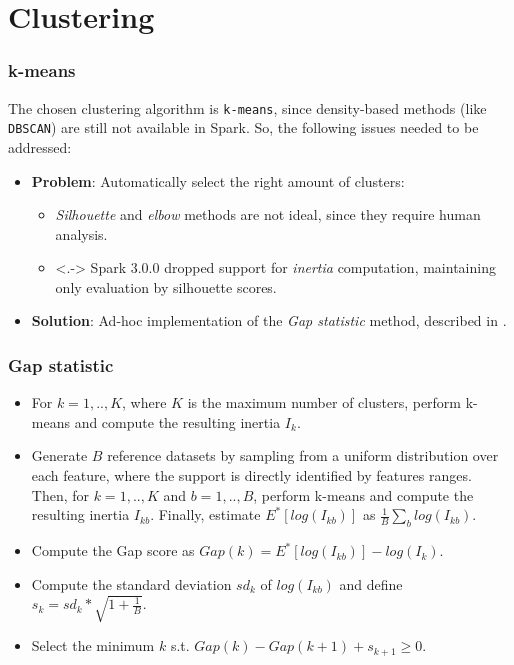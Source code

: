 \documentclass{beamer}
\begin{document}
\section{Clustering}
\begin{frame}
  \frametitle{k-means}
    The chosen clustering algorithm is \texttt{k-means}, since density-based methods (like \texttt{DBSCAN}) are still not available in Spark. So, the following issues needed to be addressed:
    \begin{itemize}[<+->]
      \item \textbf{Problem}: Automatically select the right amount of clusters:
      \begin{itemize}
        \item \textit{Silhouette} and \textit{elbow} methods are not ideal, since they require human analysis.
        \item<.-> Spark 3.0.0 dropped support for \textit{inertia} computation, maintaining only evaluation by silhouette scores.
      \end{itemize} 
      \item \textbf{Solution}: Ad-hoc implementation of the \textit{Gap statistic} method, described in \cite{gap}.
    \end{itemize}
\end{frame}

\begin{frame}
  \frametitle{Gap statistic}
    \begin{itemize}[<+->]
      \item For $k = 1, .., K$, where $K$ is the maximum number of clusters, perform k-means and compute the resulting inertia $I_{k}$.
      \item Generate $B$ reference datasets by sampling from a uniform distribution over each feature, where the support is directly identified by features ranges. Then, for $k = 1, .., K$ and $b = 1, .., B$, perform k-means and compute the resulting inertia $I_{kb}$. Finally, estimate $E^{*}[log(I_{kb})]$ as $\frac{1}{B} \sum_{b}log(I_{kb})$.
      \item Compute the Gap score as $Gap(k) = E^{*}[log(I_{kb})] - log(I_{k})$.
      \item Compute the standard deviation $sd_{k}$ of $log(I_{kb})$ and define $s_{k} = sd_{k} * \sqrt{1 + \frac{1}{B}}$.
      \item Select the minimum $k$ s.t. $Gap(k) - Gap(k + 1) + s_{k + 1} \geq 0$.
    \end{itemize}
\end{frame}
\end{document}
